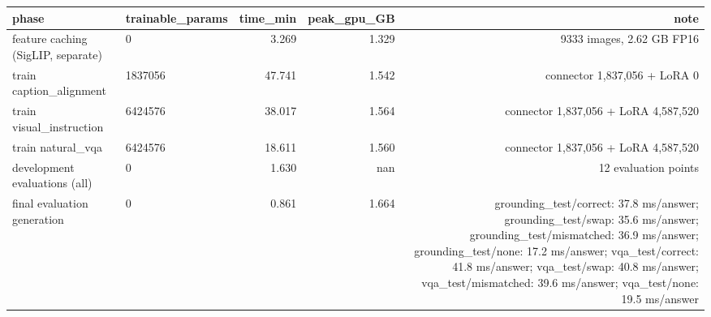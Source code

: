 \begin{tabular}{llrrr}
\toprule
phase & trainable\_params & time\_min & peak\_gpu\_GB & note \\
\midrule
feature caching (SigLIP, separate) & 0 & 3.269 & 1.329 & 9333 images, 2.62 GB FP16 \\
train caption\_alignment & 1837056 & 47.741 & 1.542 & connector 1,837,056 + LoRA 0 \\
train visual\_instruction & 6424576 & 38.017 & 1.564 & connector 1,837,056 + LoRA 4,587,520 \\
train natural\_vqa & 6424576 & 18.611 & 1.560 & connector 1,837,056 + LoRA 4,587,520 \\
development evaluations (all) & 0 & 1.630 & nan & 12 evaluation points \\
final evaluation generation & 0 & 0.861 & 1.664 & grounding\_test/correct: 37.8 ms/answer; grounding\_test/swap: 35.6 ms/answer; grounding\_test/mismatched: 36.9 ms/answer; grounding\_test/none: 17.2 ms/answer; vqa\_test/correct: 41.8 ms/answer; vqa\_test/swap: 40.8 ms/answer; vqa\_test/mismatched: 39.6 ms/answer; vqa\_test/none: 19.5 ms/answer \\
\bottomrule
\end{tabular}
